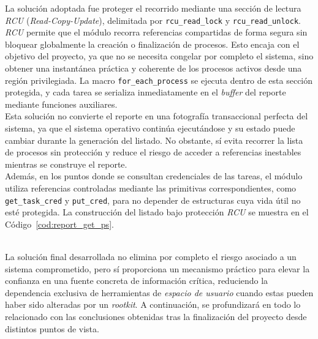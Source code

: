 La solución adoptada fue proteger el recorrido mediante una sección de lectura \textit{RCU} (\textit{Read-Copy-Update}), delimitada por \verb|rcu_read_lock| y \verb|rcu_read_unlock|.
\textit{RCU} permite que el módulo recorra referencias compartidas de forma segura sin bloquear globalmente la creación o finalización de procesos.
Esto encaja con el objetivo del proyecto, ya que no se necesita congelar por completo el sistema, sino obtener una instantánea práctica y coherente de los procesos activos desde una región privilegiada.
La macro \verb|for_each_process| se ejecuta dentro de esta sección protegida, y cada tarea se serializa inmediatamente en el \textit{buffer} del reporte mediante funciones auxiliares.\\

Esta solución no convierte el reporte en una fotografía transaccional perfecta del sistema, ya que el sistema operativo continúa ejecutándose y su estado puede cambiar durante la generación del listado.
No obstante, sí evita recorrer la lista de procesos sin protección y reduce el riesgo de acceder a referencias inestables mientras se construye el reporte.\\

Además, en los puntos donde se consultan credenciales de las tareas, el módulo utiliza referencias controladas mediante las primitivas correspondientes, como \verb|get_task_cred| y \verb|put_cred|, para no depender de estructuras cuya vida útil no esté protegida.
La construcción del listado bajo protección \textit{RCU} se muestra en el Código~\ref{cod:report_get_ps}.\\\\

\newpage

La solución final desarrollada no elimina por completo el riesgo asociado a un sistema comprometido, pero sí proporciona un mecanismo práctico para elevar la confianza en una fuente concreta de información crítica, reduciendo la dependencia exclusiva de herramientas de \textit{espacio de usuario} cuando estas pueden haber sido alteradas por un \textit{rootkit}.
A continuación, se profundizará en todo lo relacionado con las conclusiones obtenidas tras la finalización del proyecto desde distintos puntos de vista.
